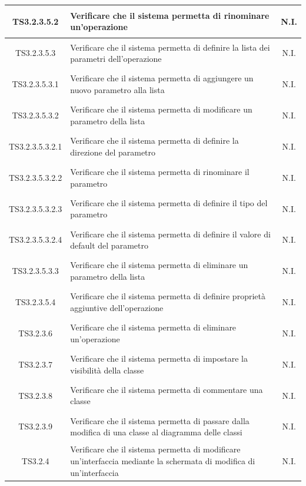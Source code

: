 \documentclass[../PianoDiQualifica.tex]{subfiles}
\begin{document}
\begin{longtable}{|c|>{\centering}p{10cm}|c|}
	\hline
	\hypertarget{TS3.2.3.5.2}{TS3.2.3.5.2} & Verificare che il sistema permetta di rinominare un'operazione & N.I. \\
	\hline
	\hypertarget{TS3.2.3.5.3}{TS3.2.3.5.3} & Verificare che il sistema permetta di definire la lista dei parametri dell'operazione & N.I. \\
	\hline
	\hypertarget{TS3.2.3.5.3.1}{TS3.2.3.5.3.1} & Verificare che il sistema permetta di aggiungere un nuovo parametro alla lista & N.I. \\
	\hline
	\hypertarget{TS3.2.3.5.3.2}{TS3.2.3.5.3.2} & Verificare che il sistema permetta di modificare un parametro della lista & N.I. \\
	\hline
	\hypertarget{TS3.2.3.5.3.2.1}{TS3.2.3.5.3.2.1} & Verificare che il sistema permetta di definire la direzione del parametro & N.I. \\
	\hline
	\hypertarget{TS3.2.3.5.3.2.2}{TS3.2.3.5.3.2.2} & Verificare che il sistema permetta di rinominare il parametro & N.I. \\
	\hline
	\hypertarget{TS3.2.3.5.3.2.3}{TS3.2.3.5.3.2.3} & Verificare che il sistema permetta di definire il tipo del parametro & N.I. \\
	\hline
	\hypertarget{TS3.2.3.5.3.2.4}{TS3.2.3.5.3.2.4} & Verificare che il sistema permetta di definire il valore di default del parametro & N.I. \\
	\hline
	\hypertarget{TS3.2.3.5.3.3}{TS3.2.3.5.3.3} & Verificare che il sistema permetta di eliminare un parametro della lista & N.I. \\
	\hline
	\hypertarget{TS3.2.3.5.4}{TS3.2.3.5.4} & Verificare che il sistema permetta di definire proprietà aggiuntive dell'operazione & N.I. \\
	\hline
	\hypertarget{TS3.2.3.6}{TS3.2.3.6} & Verificare che il sistema permetta di eliminare un'operazione & N.I. \\
	\hline
	\hypertarget{TS3.2.3.7}{TS3.2.3.7} & Verificare che il sistema permetta di impostare la visibilità della classe & N.I. \\
	\hline
	\hypertarget{TS3.2.3.8}{TS3.2.3.8} & Verificare che il sistema permetta di commentare una classe & N.I. \\
	\hline
	\hypertarget{TS3.2.3.9}{TS3.2.3.9} & Verificare che il sistema permetta di passare dalla modifica di una classe al diagramma delle classi & N.I. \\
	\hline
	\hypertarget{TS3.2.4}{TS3.2.4} & Verificare che il sistema permetta di modificare un'interfaccia mediante la schermata di modifica di un'interfaccia & N.I. \\

\end{longtable}
\end{document}
